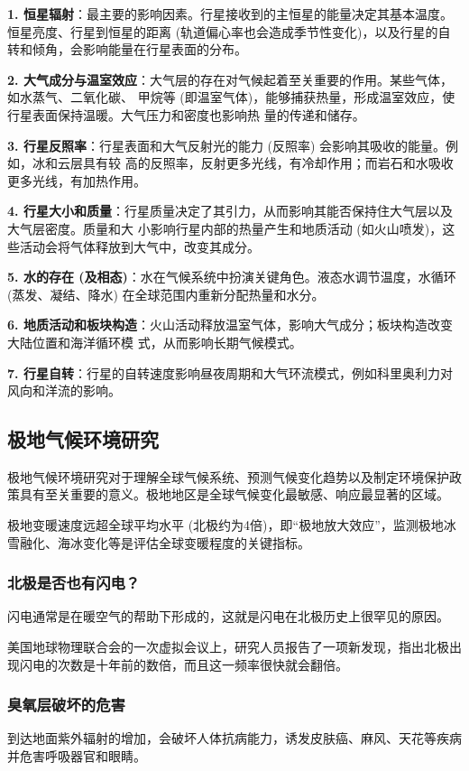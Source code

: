 \documentclass[12pt,a4paper]{article}
\begin{document}
	\textbf{1. 恒星辐射}：最主要的影响因素。行星接收到的主恒星的能量决定其基本温度。恒星亮度、行星到恒星的距离 (轨道偏心率也会造成季节性变化)，以及行星的自转和倾角，会影响能量在行星表面的分布。
	
	\textbf{2. 大气成分与温室效应}：大气层的存在对气候起着至关重要的作用。某些气体，如水蒸气、二氧化碳、
	甲烷等 (即温室气体)，能够捕获热量，形成温室效应，使行星表面保持温暖。大气压力和密度也影响热
	量的传递和储存。
	
	\textbf{3. 行星反照率}：行星表面和大气反射光的能力 (反照率) 会影响其吸收的能量。例如，冰和云层具有较
	高的反照率，反射更多光线，有冷却作用；而岩石和水吸收更多光线，有加热作用。
	
	\textbf{4. 行星大小和质量}：行星质量决定了其引力，从而影响其能否保持住大气层以及大气层密度。质量和大
	小影响行星内部的热量产生和地质活动 (如火山喷发)，这些活动会将气体释放到大气中，改变其成分。
	
	\textbf{5. 水的存在 (及相态)}：水在气候系统中扮演关键角色。液态水调节温度，水循环 (蒸发、凝结、降水)
	在全球范围内重新分配热量和水分。
	
	\textbf{6. 地质活动和板块构造}：火山活动释放温室气体，影响大气成分；板块构造改变大陆位置和海洋循环模
	式，从而影响长期气候模式。
	
	\textbf{7. 行星自转}：行星的自转速度影响昼夜周期和大气环流模式，例如科里奥利力对风向和洋流的影响。
	
	\subsection{极地气候环境研究}
	极地气候环境研究对于理解全球气候系统、预测气候变化趋势以及制定环境保护政策具有至关重要的意义。极地地区是全球气候变化最敏感、响应最显著的区域。
	
	极地变暖速度远超全球平均水平 (北极约为4倍)，即“极地放大效应”，监测极地冰雪融化、海冰变化等是评估全球变暖程度的关键指标。
	
	\subsubsection{北极是否也有闪电？}
	闪电通常是在暖空气的帮助下形成的，这就是闪电在北极历史上很罕见的原因。
	
	美国地球物理联合会的一次虚拟会议上，研究人员报告了一项新发现，指出北极出现闪电的次数是十年前的数倍，而且这一频率很快就会翻倍。
	\subsubsection{臭氧层破坏的危害}
	到达地面紫外辐射的增加，会破坏人体抗病能力，诱发皮肤癌、麻风、天花等疾病并危害呼吸器官和眼睛。
	
\end{document}
